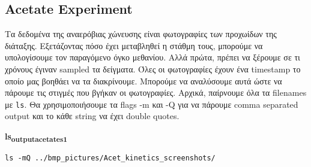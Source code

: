 \documentclass[11pt]{article}
\begin{document}
\subsection{Acetate Experiment}
\label{sec:org4c1e387}
Τα δεδομένα της αναερόβιας χώνευσης είναι φωτογραφίες των προχωίδων της διάταξης. Εξετάζοντας πόσο έχει μεταβληθεί η στάθμη τους, μπορούμε να υπολογίσουμε τον παραγόμενο όγκο μεθανίου. Αλλά πρώτα, πρέπει να ξέρουμε σε τι χρόνους έγιναν sampled τα δείγματα. Όλες οι φωτογραφίες έχουν ένα timestamp το οποίο μας βοηθάει να τα διακρίνουμε. Μπορούμε να αναλύσουμε αυτά ώστε να πάρουμε τις στιγμές που βγήκαν οι φωτογραφίες. Αρχικά, παίρνουμε όλα τα filenames με \texttt{ls}. Θα χρησιμοποιήσουμε τα flags -m και -Q για να πάρουμε comma separated output και το κάθε string να έχει double quotes.

\textbf{ls\textsubscript{output}\textsubscript{acetate}\textsubscript{s1}}
\begin{verbatim}
ls -mQ ../bmp_pictures/Acet_kinetics_screenshots/
\end{verbatim}
\end{document}

